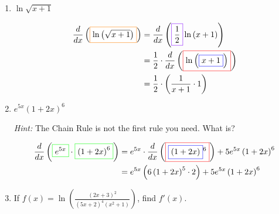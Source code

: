 \documentclass{article}
\begin{document}
\begin{enumerate}
\begin{enumerate}
\begin{enumerate}
    \item
      \begin{problem}[\vfill\newpage]
        $\ln \sqrt{x + 1}$
      \end{problem}

      \begin{solution}
        \begin{align*}
          \frac{d}{dx} \left(\fcolorbox{orange}{white}{$\displaystyle \ln\left(\sqrt{x+ 1}\right)$}\right) = {} & \frac{d}{dx} \left(\fcolorbox{purple}{white}{$\displaystyle \frac{1}{2}$} \ln\left(x+ 1\right)\right) \\
          = {} & \frac{1}{2}\cdot \frac{d}{dx} \left(\fcolorbox{red}{white}{$\displaystyle \ln\left(\fcolorbox{blue}{white}{$\displaystyle x+ 1$}\right)$}\right) \\
          = {} & \frac{1}{2}\cdot \left(\frac{1}{x+ 1}\cdot 1\right)
        \end{align*}
      \end{solution}

    \item %

    \begin{problem}[\vfill]
     $  e^{5x}(1+2x)^6$  

      \emph{Hint:} The Chain Rule is not the first rule you need.  What
      is?
    \end{problem}

    \begin{solution}
      \begin{align*}
        \frac{d}{dx} \left(\fcolorbox{green}{white}{$\displaystyle  e^ { 5 x} $}\cdot \fcolorbox{green}{white}{$\displaystyle  \left(1+ 2 x\right)^ { 6} $}\right) = {} & e^ { 5 x} \cdot \frac{d}{dx} \left(\fcolorbox{red}{white}{$\displaystyle \fcolorbox{blue}{white}{$\displaystyle  \left(1+ 2 x\right)$}^ { 6 } $}\right)+ 5 e^ { 5 x} \left(1+ 2 x\right)^ { 6}  \\
        = {} & e^ { 5 x} \left(6 \left(1+ 2 x\right)^ { 5} \cdot 2\right)+ 5 e^ { 5 x} \left(1+ 2 x\right)^ { 6} 
      \end{align*}
    \end{solution}

      \item
    \begin{problem}[\vfill]
      If $\displaystyle f(x) = \ln\left(\frac{\left(2 x+
            3\right)^2}{\left(5 x+ 2\right)^4 \left(x^2+
            1\right)}\right)$, find $f'(x)$.


\end{problem}
\end{enumerate}
\end{enumerate}
\end{enumerate}
\end{document}

